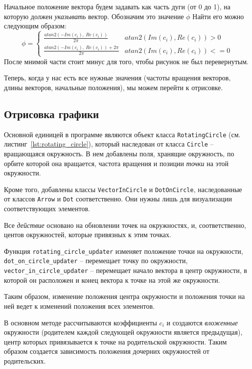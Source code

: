 Начальное положение вектора будем задавать как часть дуги (от 0 до 1), на которую должен \textit{указывать} вектор. Обозначим это значение $\phi$
Найти его можно следующим образом: 
\begin{equation}
    \phi = \begin{cases}
        \frac{atan2(-Im(c_i),~Re(c_i))}{2\pi} & atan2(Im(c_i), Re(c_i)) > 0\\
        \frac{atan2(-Im(c_i),~Re(c_i)) + 2\pi}{2\pi} & atan2(Im(c_i), Re(c_i)) <= 0
    \end{cases}
\end{equation}
После мнимой части стоит минус для того, чтобы рисунок не был перевернутым. 

Теперь, когда у нас есть все нужные значения (частоты вращения векторов, длины векторов, начальные положения), мы можем перейти к отрисовке. 

\subsection{Отрисовка графики}

Основной единицей в программе являются объект класса \texttt{RotatingCircle} (см. листинг~\ref{lst:rotating_circle}), который наследован от класса \texttt{Circle} -- вращающаяся окружность. 
В нем добавлены поля, хранящие окружность, по орбите которой она вращается, частота вращения и позиции \textit{точки} на этой окружности. 

Кроме того, добавлены классы \texttt{VectorInCircle} и \texttt{DotOnCircle}, наследованные от классов 
\texttt{Arrow} и \texttt{Dot} соответственно. Они нужны лишь для визуализации соответствующих элементов. 

Все \textit{действие} основано на обновлении точек на окружностях, и, соответственно, центов окружностей, которые привязных к этим точках.

Функция \texttt{rotating\_circle\_updater} изменяет положение точки на окружности, \texttt{dot\_on\_circle\_updater} -- перемещает точку по окружности, \texttt{vector\_in\_circle\_updater} -- перемещает начало вектора в центр окружности, в которой он расположен и конец вектора к точке на этой же окружности. 

Таким образом, изменение положения центра окружности и положения точки на ней ведет к изменений положения всех элементов. 

В основном методе рассчитываются коэффициенты $c_i$ и создаются \textit{вложенные} окружности (родителем каждой следующей окружности является предыдущая), центр которых привязывается к точке на родительской окружности. 
Таким образом создается зависимость положения дочерних окружностей от родительских. 

